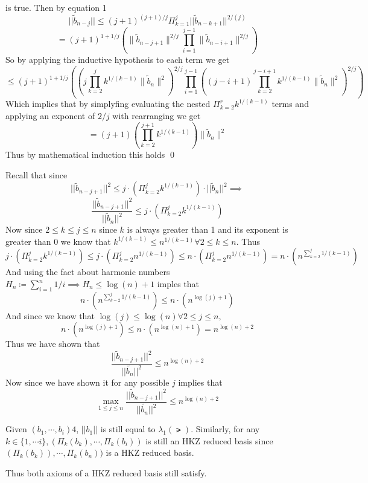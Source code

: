 \documentclass[12pt]{amsart}
\begin{document}
\begin{problem}
\begin{subproblem}
      is true. Then by equation 1
      \[||\tilde{b}_{n-j}|| \leq (j+1)^{(j+1) /j} \Pi_{k=1}^j ||\tilde{b}_{n-k+1}||^{2/(j)}\]
      \[= (j+1)^{1+1/j} ( \|\tilde{b}_{n-j+1}\|^{2/j} \prod_{i=1}^{j-1} \|\tilde{b}_{n-i+1}\|^{2/j} ) \]
      So by applying the inductive hypothesis to each term we get
      \[\leq (j+1)^{1+1/j} ( \left( j \prod_{k=2}^j k^{1/(k-1)} \|\tilde{b}_n\|^2 \right)^{2/j} \prod_{i=1}^{j-1} \left( (j-i+1) \prod_{k=2}^{j-i+1} k^{1/(k-1)} \|\tilde{b}_n\|^2 \right)^{2/j} )\]
      Which implies that by simplyfing evaluating the nested $\Pi_{k=2}^r k^{1/(k-1)}$ terms and applying an exponent of $2/j$ with rearranging we get
      \[= (j+1) \left( \prod_{k=2}^{j+1} k^{1/(k-1)} \right) \|\tilde{b}_n\|^2\]
      Thus by mathematical induction this holds \qed
    \end{subproblem}
    \begin{subproblem}
      Recall that since 
      \[||\tilde{b}_{n-j+1}||^2\leq j \cdot (\Pi_{k=2}^j k^{1/(k-1)})\cdot ||\tilde{b}_n||^2 \implies\]
      \[\frac{||\tilde{b}_{n-j+1}||^2}{||\tilde{b}_n||^2}\leq j \cdot (\Pi_{k=2}^j k^{1/(k-1)})\]
      Now since $2\leq k\leq j\leq n$ since $k$ is always greater than 1 and its exponent is greater than 0 we know that $k^{1/(k-1)} \leq n^{1/(k-1)}\forall 2\leq k\leq n$. Thus 
      \[j \cdot (\Pi_{k=2}^j k^{1/(k-1)}) \leq j\cdot(\Pi_{k=2}^j n^{1/(k-1)}) \leq n \cdot (\Pi_{k=2}^j n^{1/(k-1)}) = n\cdot (n^{\sum_{k=2}^j 1/(k-1)})\]
    And using the fact about harmonic numbers $H_n \coloneq \sum_{i=1}^n 1/i \implies H_n \leq \log(n)+1$ imples that 
    \[n\cdot (n^{\sum_{k=2}^j 1/(k-1)})\leq n\cdot(n^{\log(j)+1})\]
    And since we know that $\log(j)\leq \log(n) \forall 2\leq j \leq n,$
    \[ n\cdot(n^{\log(j)+1}) \leq n\cdot(n^{\log(n)+1}) = n^{\log(n)+2}\]
    Thus we have shown that 
  \[\frac{||\tilde{b}_{n-j+1}||^2}{||\tilde{b_n}||^2}\leq n^{\log(n)+2}\]
    Now since we have shown it for any possible $j$ implies that 
    \[\max_{1\leq j\leq n}\frac{||\tilde{b}_{n-j+1}||^2}{||\tilde{b_n}||^2}\leq n^{\log(n)+2}\]
    \end{subproblem}
    \begin{subproblem}
      Given $(b_1,\cdots,b_i)4$, $||b_1||$ is still equal to $\lambda_1(\lat)$. Similarly, for any $k \in \{1,\cdots i\}, (\Pi_k(b_k), \cdots, \Pi_k(b_i))$ is still an HKZ reduced basis since $(\Pi_k(b_k)),\cdots, \Pi_k(b_n))$ is a HKZ reduced basis.

      Thus both axioms of a HKZ reduced basis still satisfy.


\end{subproblem}
\end{problem}
\end{document}
